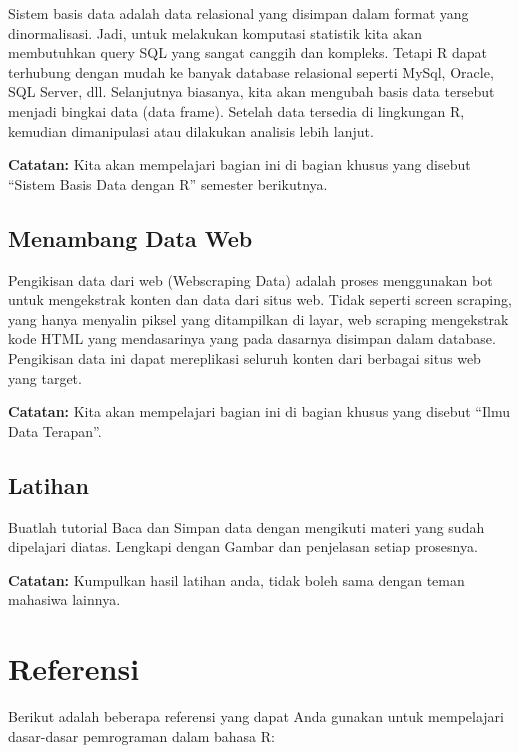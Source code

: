 \documentclass[
]{book}
\begin{document}
Sistem basis data adalah data relasional yang disimpan dalam format yang dinormalisasi. Jadi, untuk melakukan komputasi statistik kita akan membutuhkan query SQL yang sangat canggih dan kompleks. Tetapi R dapat terhubung dengan mudah ke banyak database relasional seperti MySql, Oracle, SQL Server, dll. Selanjutnya biasanya, kita akan mengubah basis data tersebut menjadi bingkai data (data frame). Setelah data tersedia di lingkungan R, kemudian dimanipulasi atau dilakukan analisis lebih lanjut.

\textbf{Catatan:} Kita akan mempelajari bagian ini di bagian khusus yang disebut ``Sistem Basis Data dengan R'' semester berikutnya.

\hypertarget{menambang-data-web}{%
\section{Menambang Data Web}\label{menambang-data-web}}

Pengikisan data dari web (Webscraping Data) adalah proses menggunakan bot untuk mengekstrak konten dan data dari situs web. Tidak seperti screen scraping, yang hanya menyalin piksel yang ditampilkan di layar, web scraping mengekstrak kode HTML yang mendasarinya yang pada dasarnya disimpan dalam database. Pengikisan data ini dapat mereplikasi seluruh konten dari berbagai situs web yang target.

\textbf{Catatan:} Kita akan mempelajari bagian ini di bagian khusus yang disebut ``Ilmu Data Terapan''.

\hypertarget{latihan-5}{%
\section{Latihan}\label{latihan-5}}

Buatlah tutorial Baca dan Simpan data dengan mengikuti materi yang sudah dipelajari diatas. Lengkapi dengan Gambar dan penjelasan setiap prosesnya.

\textbf{Catatan:} Kumpulkan hasil latihan anda, tidak boleh sama dengan teman mahasiwa lainnya.

\hypertarget{referensi}{%
\chapter{Referensi}\label{referensi}}

Berikut adalah beberapa referensi yang dapat Anda gunakan untuk mempelajari dasar-dasar pemrograman dalam bahasa R:
\end{document}
